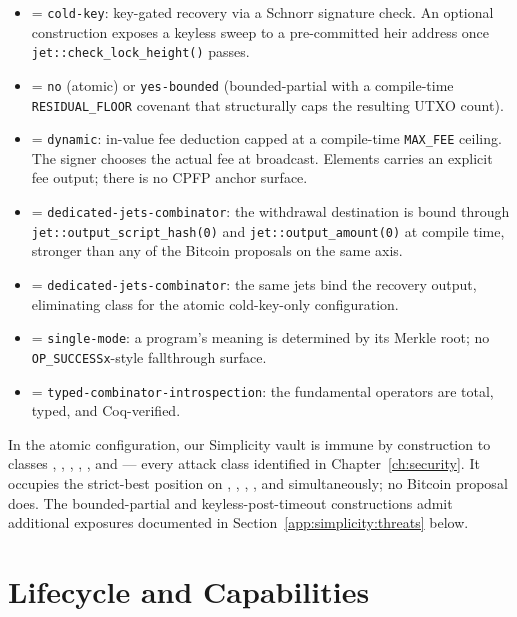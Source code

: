 \begin{itemize}
  \item \axauth{} = \texttt{cold-key}: key-gated recovery via a
    Schnorr signature check. An optional construction exposes a
    keyless sweep to a pre-committed heir address once
    \texttt{jet::check\_lock\_height()} passes.
  \item \axrevault{} = \texttt{no} (atomic) or \texttt{yes-bounded}
    (bounded-partial with a compile-time \texttt{RESIDUAL\_FLOOR}
    covenant that structurally caps the resulting UTXO count).
  \item \axfee{} = \texttt{dynamic}: in-value fee deduction capped at a
    compile-time \texttt{MAX\_FEE} ceiling. The signer chooses the
    actual fee at broadcast. Elements carries an explicit fee output;
    there is no CPFP anchor surface.
  \item \axwdbind{} = \texttt{dedicated-jets-combinator}: the
    withdrawal destination is bound through
    \texttt{jet::output\_script\_hash(0)} and
    \texttt{jet::output\_amount(0)} at compile time, stronger than
    any of the Bitcoin proposals on the same axis.
  \item \axrecbind{} = \texttt{dedicated-jets-combinator}: the same
    jets bind the recovery output, eliminating class \classcold{}
    for the atomic cold-key-only configuration.
  \item \axopsurf{} = \texttt{single-mode}: a program's meaning is
    determined by its Merkle root; no \texttt{OP\_SUCCESSx}-style
    fallthrough surface.
  \item \axintro{} = \texttt{typed-combinator-introspection}: the
    fundamental operators are total, typed, and Coq-verified.
\end{itemize}

In the atomic configuration, our Simplicity vault is immune by
construction to classes \classfee{}, \classgrief{}, \classscale{},
\classhot{}, \classcold{}, and \classmode{} --- every attack class
identified in Chapter~\ref{ch:security}. It occupies the strict-best
position on \axauth{}, \axrevault{}, \axwdbind{}, \axrecbind{}, and
\axintro{} simultaneously; no Bitcoin proposal does. The
bounded-partial and keyless-post-timeout constructions admit
additional exposures documented in Section~\ref{app:simplicity:threats}
below.

\section{Lifecycle and Capabilities}
\label{app:simplicity:empirical}

